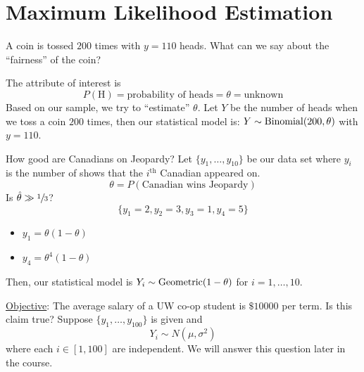 \section{Maximum Likelihood Estimation}

\begin{exbox}
    \begin{example}
        A coin is tossed $ 200 $ times with $ y=110 $ heads. What can we say
        about the ``fairness'' of the coin?
        
        The attribute of interest is
        \[ P(\text{H})=\text{probability of heads}=\theta=\text{unknown} \]
        Based on our sample, we try to ``estimate'' $ \theta $.
        Let $ Y $ be the number of heads when we toss a coin $ 200 $ times,
        then our statistical model is: $ Y \sim \operatorname{Binomial}(200,\theta) $
        with $ y=110 $.
    \end{example}
\end{exbox}

\begin{exbox}
    \begin{example}
        How good are Canadians on Jeopardy? Let $ \{y_1,\ldots ,y_{10}\} $
        be our data set where $ y_i $ is the number of shows that the
        $ i^{\text{th}} $ Canadian appeared on.
        \[ \theta=P(\text{Canadian wins Jeopardy}) \]
        Is $ \hat{\theta}\gg\sfrac{1}{3} $?
        \[ \{y_1=2,y_2=3,y_3=1,y_4=5\} \]
        \begin{itemize}
            \item $ y_1=\theta(1-\theta) $
            \item $ y_4=\theta^4(1-\theta) $
        \end{itemize}
        Then, our statistical model is $ Y_i \sim \operatorname{Geometric}(1-\theta) $
        for $ i=1,\ldots ,10 $.
    \end{example}
\end{exbox}
\underline{Objective}: The average salary of a UW co-op student is $ \$10000 $ per term.
Is this claim true? Suppose $ \{y_1,\ldots ,y_{100}\} $ is given and
\[ Y_i \sim N(\mu,\sigma^2) \]
where each $ i\in[1,100] $ are independent. We will answer this question later in the course.
